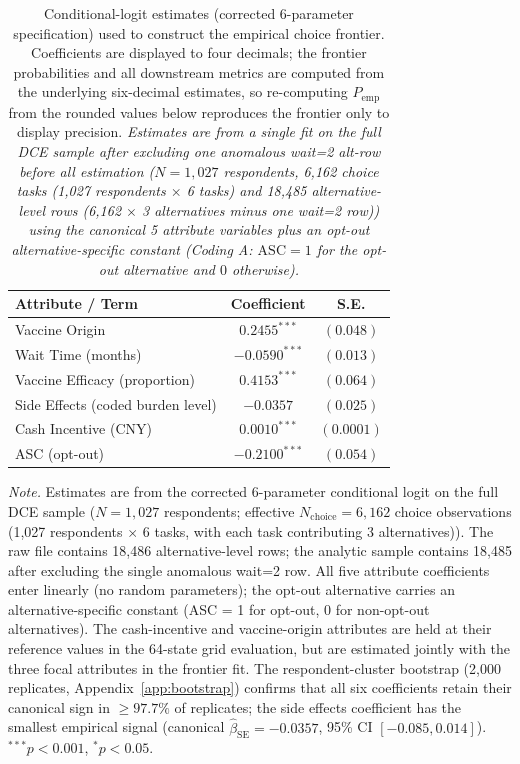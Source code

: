 \documentclass[11pt]{article}
\begin{document}
\begin{table}[h]
\centering
\caption{Conditional-logit estimates (corrected 6-parameter specification) used to construct the empirical choice frontier. Coefficients are displayed to four decimals; the frontier probabilities and all downstream metrics are computed from the underlying six-decimal estimates, so re-computing $P_{\text{emp}}$ from the rounded values below reproduces the frontier only to display precision. \emph{Estimates are from a single fit on the full DCE sample after excluding one anomalous wait=2 alt-row before all estimation ($N = 1{,}027$ respondents, 6,162 choice tasks (1,027 respondents $\times$ 6 tasks) and 18,485 alternative-level rows (6,162 $\times$ 3 alternatives minus one wait=2 row)) using the canonical 5 attribute variables plus an opt-out alternative-specific constant (Coding A: $\mathrm{ASC} = 1$ for the opt-out alternative and $0$ otherwise).}}
\label{tab:S5}
\small
\setlength{\tabcolsep}{8pt}
\begin{tabular}{l c c}
\toprule
\textbf{Attribute / Term} & \textbf{Coefficient} & \textbf{S.E.} \\
\midrule
Vaccine Origin & $0.2455^{***}$ & $(0.048)$ \\
Wait Time (months) & $-0.0590^{***}$ & $(0.013)$ \\
Vaccine Efficacy (proportion) & $0.4153^{***}$ & $(0.064)$ \\
Side Effects (coded burden level) & $-0.0357$ & $(0.025)$ \\
Cash Incentive (CNY) & $0.0010^{***}$ & $(0.0001)$ \\
ASC (opt-out) & $-0.2100^{***}$ & $(0.054)$ \\
\bottomrule
\end{tabular}

\vspace{0.4em}
\begin{minipage}{0.95\textwidth}
\small
\textit{Note.} Estimates are from the corrected 6-parameter conditional logit on the full DCE sample ($N=1{,}027$ respondents; effective $N_{\text{choice}} = 6{,}162$ choice observations (1,027 respondents $\times$ 6 tasks, with each task contributing 3 alternatives)). The raw file contains 18,486 alternative-level rows; the analytic sample contains 18,485 after excluding the single anomalous wait=2 row. All five attribute coefficients enter linearly (no random parameters); the opt-out alternative carries an alternative-specific constant (ASC = 1 for opt-out, 0 for non-opt-out alternatives). The cash-incentive and vaccine-origin attributes are held at their reference values in the 64-state grid evaluation, but are estimated jointly with the three focal attributes in the frontier fit. The respondent-cluster bootstrap (2{,}000 replicates, Appendix~\ref{app:bootstrap}) confirms that all six coefficients retain their canonical sign in $\geq 97.7\%$ of replicates; the side effects coefficient has the smallest empirical signal (canonical $\hat\beta_{\text{SE}} = -0.0357$, 95\% CI $[-0.085, 0.014]$). $^{***}p < 0.001$, $^{*}p < 0.05$.
\end{minipage}
\end{table}
\end{document}
